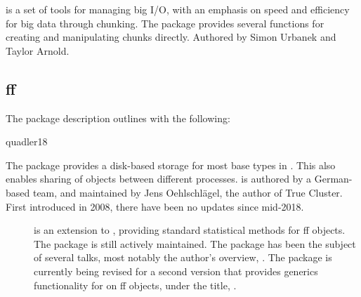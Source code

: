  is a set of tools for managing big I/O, with an emphasis on
speed and efficiency for big data through chunking\cite{urbanek20b}. The
package provides several functions for creating and manipulating chunks
directly. Authored by Simon Urbanek and Taylor Arnold.

\subsection{ff}\label{subsec:ff}

The package description outlines  with the following:

qu{adler18}

The package provides a disk-based storage for most base types in \R{}. This
also enables sharing of objects between different \R{} processes.  is
authored by a German-based team, and maintained by Jens Oehlschlägel,
the author of True Cluster. First introduced in
2008\cite{adler08:_large_r}, there have been no updates since
mid-2018.

\begin{description}
\item[\cite{jonge20}]
        is an extension to , providing standard statistical methods for ff
        objects. The package is still actively maintained. The package has been
        the subject of several talks, most notably the author's overview,
        \cite{wijffels13}. The package is currently being revised for a second
        version that provides generics functionality for  on ff objects,
        under the title, \cite{jonge15}.
\end{description}
